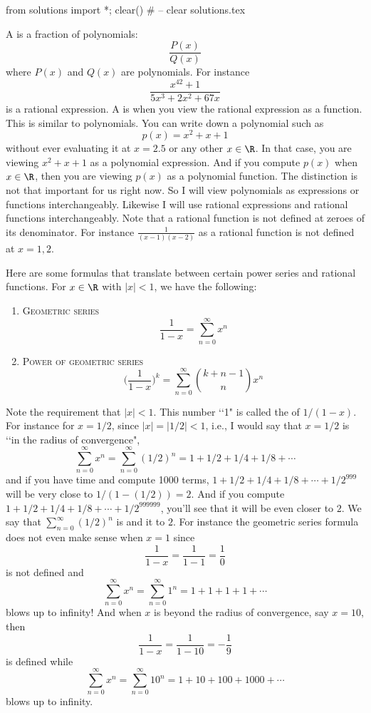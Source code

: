 \begin{python0}
from solutions import *; clear() # -- clear solutions.tex
\end{python0}

A  is a fraction of polynomials:
\[
\frac{P(x)}{Q(x)}
\]
where $P(x)$ and $Q(x)$ are polynomials.
For instance
\[
\frac{x^{42} + 1}{5x^3 + 2x^2 + 67x}
\]
is a rational expression.
A  is when you view the rational
expression as a function.
This is similar to polynomials.
You can write down a polynomial such as
\[
p(x) = x^2 + x + 1
\]
without ever evaluating it at $x = 2.5$ or any other $x \in \R$.
In that case, you are viewing $x^2 + x + 1$ as a
polynomial expression.
And if you compute $p(x)$ when $x \in \R$, then you are
viewing $p(x)$ as a polynomial function.
The distinction is not that important for us right now.
So I will view polynomials as expressions or functions
interchangeably.
Likewise I will use rational expressions and rational functions
interchangeably.
Note that a rational function is not defined at zeroes
of its denominator.
For instance $\frac{1}{(x-1)(x-2)}$ as a rational function
is not defined at $x = 1, 2$.

Here are some formulas that translate between certain power series and rational 
functions.
For $x \in \R$ with $|x| < 1$, we have the following:
\begin{enumerate}
\item[]\textsc{Geometric series}
\[
\frac{1}{1-x} = \sum_{n=0}^\infty x^n 
\]
\item[]\textsc{Power of geometric series}
\[
\biggl(
\frac{1}{1-x}
\biggr)^k
 = \sum_{n=0}^\infty \binom{k+n-1}{n} x^n 
\]
\end{enumerate}

Note the requirement that $|x| < 1$.
This number \lq\lq1" is called the  of $1/(1-x)$.
For instance for $x = 1/2$, since $|x| = |1/2| < 1$, i.e., I would say that $x=1/2$ is
\lq\lq in the radius of convergence",
\[
\sum_{n=0}^\infty x^n = \sum_{n=0}^\infty (1/2)^n = 1 + 1/2 + 1/4 + 1/8 + \cdots
\]
and if you have time and compute 1000 terms, $1 + 1/2 + 1/4 + 1/8 + \cdots + 1/2^{999}$
will be very close to $1/(1 - (1/2)) = 2$.
And if you compute $1 + 1/2 + 1/4 + 1/8 + \cdots + 1/2^{999999}$, you'll see that it will be even closer to $2$.
We say that $\sum_{n=0}^\infty (1/2)^n$ is
and it
to $2$.
For instance the geometric series formula does not even make sense when $x = 1$ since
\[
\frac{1}{1 - x} = \frac{1}{1 - 1}  = \frac{1}{0}
\]
is not defined and
\[
\sum_{n=0}^\infty x^n = \sum_{n=0}^\infty 1^n  = 1 + 1 + 1 + 1 + \cdots
\]
blows up to infinity!
And when $x$ is beyond the radius of convergence, say $x = 10$, then
\[
\frac{1}{1 - x} = \frac{1}{1 - 10}  = -\frac{1}{9}
\]
is defined while
\[
\sum_{n=0}^\infty x^n = \sum_{n=0}^\infty 10^n  = 1 + 10 + 100 + 1000 + \cdots
\]
blows up to infinity.

